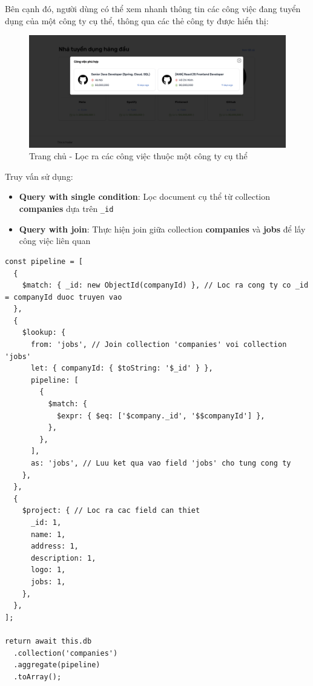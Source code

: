 Bên cạnh đó, người dùng có thể xem nhanh thông tin các công việc đang tuyển dụng của một công ty cụ thể, thông qua các thẻ công ty được hiển thị:

\begin{figure}[H]
    \centering
    \includegraphics[width=\linewidth]{DBMS-Application/Images/modal-job-company.png}
    \caption{Trang chủ - Lọc ra các công việc thuộc một công ty cụ thể}
    \label{fig:homepage-job-company}
\end{figure}

Truy vấn sử dụng:
\begin{itemize}
    \item \textbf{Query with single condition}: Lọc document cụ thể từ collection \textbf{companies} dựa trên \texttt{\_id}

    \item \textbf{Query with join}: Thực hiện join giữa collection \textbf{companies} và \textbf{jobs} để lấy công việc liên quan
\end{itemize}

\begin{lstlisting}
const pipeline = [
  {
    $match: { _id: new ObjectId(companyId) }, // Loc ra cong ty co _id = companyId duoc truyen vao
  },
  {
    $lookup: {
      from: 'jobs', // Join collection 'companies' voi collection 'jobs'
      let: { companyId: { $toString: '$_id' } },
      pipeline: [
        {
          $match: {
            $expr: { $eq: ['$company._id', '$$companyId'] },
          },
        },
      ],
      as: 'jobs', // Luu ket qua vao field 'jobs' cho tung cong ty
    },
  },
  {
    $project: { // Loc ra cac field can thiet
      _id: 1,
      name: 1,
      address: 1,
      description: 1,
      logo: 1,
      jobs: 1,
    },
  },
];

return await this.db
  .collection('companies')
  .aggregate(pipeline)
  .toArray();
\end{lstlisting}

